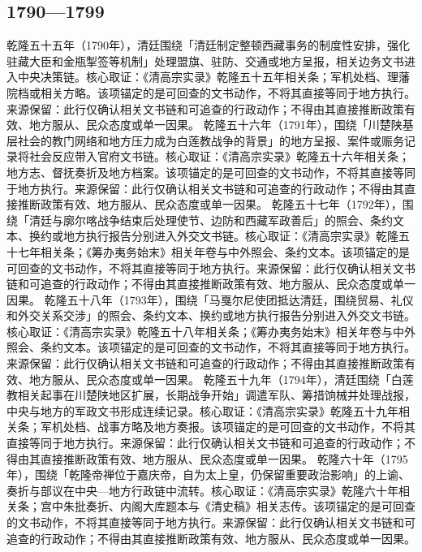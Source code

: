\subsection{1790—1799}
乾隆五十五年（1790年），清廷围绕「清廷制定整顿西藏事务的制度性安排，强化驻藏大臣和金瓶掣签等机制」处理盟旗、驻防、交通或地方呈报，相关边务文书进入中央决策链。核心取证：《清高宗实录》乾隆五十五年相关条；军机处档、理藩院档或相关方略。该项锚定的是可回查的文书动作，不将其直接等同于地方执行。来源保留：此行仅确认相关文书链和可追查的行政动作；不得由其直接推断政策有效、地方服从、民众态度或单一因果。
乾隆五十六年（1791年），围绕「川楚陕基层社会的教门网络和地方压力成为白莲教战争的背景」的地方呈报、案件或赈务记录将社会反应带入官府文书链。核心取证：《清高宗实录》乾隆五十六年相关条；地方志、督抚奏折及地方档案。该项锚定的是可回查的文书动作，不将其直接等同于地方执行。来源保留：此行仅确认相关文书链和可追查的行政动作；不得由其直接推断政策有效、地方服从、民众态度或单一因果。
乾隆五十七年（1792年），围绕「清廷与廓尔喀战争结束后处理使节、边防和西藏军政善后」的照会、条约文本、换约或地方执行报告分别进入外交文书链。核心取证：《清高宗实录》乾隆五十七年相关条；《筹办夷务始末》相关年卷与中外照会、条约文本。该项锚定的是可回查的文书动作，不将其直接等同于地方执行。来源保留：此行仅确认相关文书链和可追查的行政动作；不得由其直接推断政策有效、地方服从、民众态度或单一因果。
乾隆五十八年（1793年），围绕「马戛尔尼使团抵达清廷，围绕贸易、礼仪和外交关系交涉」的照会、条约文本、换约或地方执行报告分别进入外交文书链。核心取证：《清高宗实录》乾隆五十八年相关条；《筹办夷务始末》相关年卷与中外照会、条约文本。该项锚定的是可回查的文书动作，不将其直接等同于地方执行。来源保留：此行仅确认相关文书链和可追查的行政动作；不得由其直接推断政策有效、地方服从、民众态度或单一因果。
乾隆五十九年（1794年），清廷围绕「白莲教相关起事在川楚陕地区扩展，长期战争开始」调遣军队、筹措饷械并处理战报，中央与地方的军政文书形成连续记录。核心取证：《清高宗实录》乾隆五十九年相关条；军机处档、战事方略及地方奏报。该项锚定的是可回查的文书动作，不将其直接等同于地方执行。来源保留：此行仅确认相关文书链和可追查的行政动作；不得由其直接推断政策有效、地方服从、民众态度或单一因果。
乾隆六十年（1795年），围绕「乾隆帝禅位于嘉庆帝，自为太上皇，仍保留重要政治影响」的上谕、奏折与部议在中央—地方行政链中流转。核心取证：《清高宗实录》乾隆六十年相关条；宫中朱批奏折、内阁大库题本与《清史稿》相关志传。该项锚定的是可回查的文书动作，不将其直接等同于地方执行。来源保留：此行仅确认相关文书链和可追查的行政动作；不得由其直接推断政策有效、地方服从、民众态度或单一因果。
